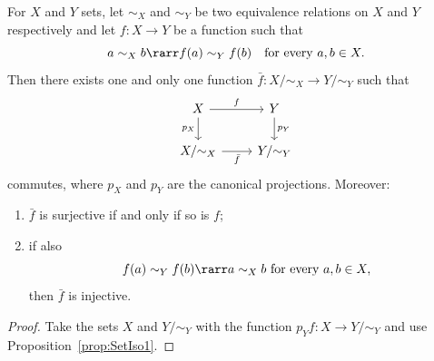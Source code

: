 \begin{corollary}\label{cor:SetIso2}
For \(X\) and \(Y\) sets, let \(\sim_X\) and \(\sim_Y\) be two equivalence relations on \(X\) and \(Y\) respectively and let \(f : X \to Y\) be a function such that
\[a \sim_X b \rarr f(a) \sim_Y f(b) \quad\text{for every } a, b \in X .\]
Then there exists one and only one function \(\bar f : X{/}{\sim_X} \to Y{/}{\sim_Y}\) such that
\[\begin{tikzcd}
X \ar["{p_X}", d, swap] \ar["f", r] & Y \ar["{p_Y}", d] \\
X{/}{\sim_X} \ar["{\bar f}", r, swap]   & Y{/}{\sim_Y}
\end{tikzcd}\]
commutes, where \(p_X\) and \(p_Y\) are the canonical projections. Moreover:
\begin{enumerate}
\item \(\bar f\) is surjective if and only if so is \(f\);
\item if also
\[f(a) \sim_Y f(b) \rarr a \sim_X b \text{ for every } a, b \in X ,\]
then \(\bar f\) is injective.
\end{enumerate}
\end{corollary}

\begin{proof}
Take the sets \(X\) and \(Y{/}{\sim_Y}\) with the function \(p_Y f : X \to Y{/}{\sim_Y}\) and use Proposition~\ref{prop:SetIso1}.
\end{proof}
